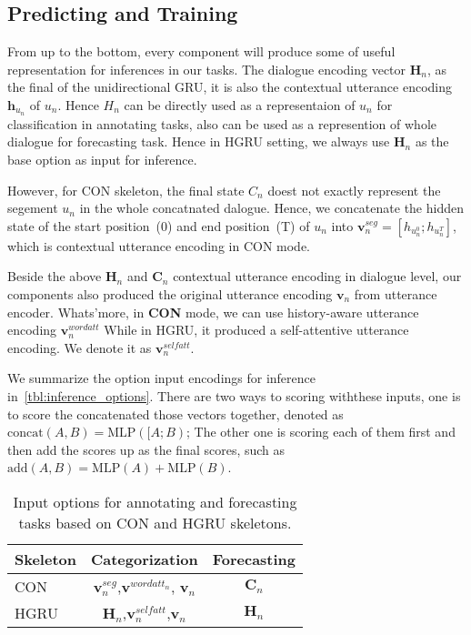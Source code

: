
\subsection{Predicting and Training}
\label{ssec:inference_and_training}

 From up to the bottom, every component will
produce some of useful representation for inferences in our tasks.
The dialogue encoding vector $\bm{H}_{n}$, as the final of the
unidirectional GRU, it is also the contextual utterance encoding
$\bm{h}_{u_{n}}$ of $u_{n}$. Hence $H_{n}$ can be directly used as a
representaion of $u_{n}$ for classification in annotating tasks, also
can be used as a represention of whole dialogue for forecasting
task. Hence in HGRU setting, we always use $\bm{H}_{n}$ as the base
option as input for inference.

However, for CON skeleton, the final state $C_{n}$ doest not exactly
represent the segement $u_{n}$ in the whole concatnated
dalogue. Hence, we concatenate the hidden state of the start
position~(0) and end position~(T) of $u_{n}$ into
$\bm{v}^{seg}_{n}=[h_{u^{0}_{n}};h_{u^{T}_{n}}]$, which is contextual
utterance encoding in CON mode.

Beside the above $\bm{H}_{n}$ and $\bm{C}_{n}$ contextual utterance
encoding in dialogue level, our components also produced the original
utterance encoding $\bm{v}_{n}$ from utterance encoder.  Whats'more,
in \textbf{CON} mode, we can use history-aware utterance encoding $\bm{v}^{wordatt}_{n}$
While in HGRU, it produced a self-attentive utterance encoding. We
denote it as $\bm{v}^{selfatt}_{n}$.

We summarize the option input encodings for inference
in~\autoref{tbl:inference_options}. There are two ways to scoring withthese
inputs, one is to score the concatenated those vectors together,
denoted as $\text{concat}(A, B)=\text{MLP}([A;B)$; The other one is
scoring each of them first and then add the scores up as the final
scores, such as $\text{add}(A,B)=\text{MLP}(A)+\text{MLP}(B)$.


\begin{table}[t]
\begin{center}
\setlength{\tabcolsep}{3pt}
\begin{tabular}{lcc}
\toprule
Skeleton & Categorization & Forecasting  \\ \hline \hline
CON      & $\bm{v}^{seg}_{n}$,$\bm{v}^{{wordatt}_{n}}$, $\bm{v}_{n}$ & $\bm{C}_{n}$ \\ \hline
HGRU     & $\bm{H}_{n}$,$\bm{v}^{selfatt}_{n}$,$\bm{v}_{n}$          & $\bm{H}_{n}$ \\ \bottomrule
\end{tabular}
\end{center}
\caption{\label{tbl:inference_options} Input options for annotating and forecasting tasks based on CON and HGRU skeletons.}

\end{table}


